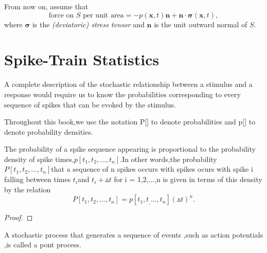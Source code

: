 

\begin{asm}
  \label{asm:surfaceForceViscous}
  From now on,
  assume that
  \begin{equation}
    \label{eq:surfaceForceSigma}
    \text{force on $S$ per unit area} = -p(\mathbf{x},t)\mathbf{n}+\mathbf{n}\cdot\boldsymbol\sigma(\mathbf{x},t),
  \end{equation}
  where $\boldsymbol\sigma$ is the \emph{(deviatoric) stress tensor} and
  $\mathbf{n}$ is the unit outward normal of $S$.
\end{asm}

\newpage
\section{Spike-Train Statistics}
\label{sec:1.4}


\begin{defn}
    A complete description of the stochastic relationship between a stimulus and a response would require us to know the probabilities corresponding to every sequence of spikes that can be evoked by the stimulus.    
\end{defn}

\begin{defn}    
    Throughout this book,we use the notation P[] to denote probabilities and p[] to denote probability densities.
\end{defn}    

\begin{thm}
    The probability of a spike sequence appearing is proportional to the probability density of spike times,$p[t_1,t_2,...,t_n]$.In other words,the probability $P[t_1,t_2,...,t_n]$that a sequence of n spikes occurs with spikes ocurs with spike i falling between times $t_i$and $t_i+\vartriangle t$ for i = 1,2,...,n is given in terms of this density by the relation 
    \begin{equation}
        P[t_1,t_2,...,t_n]=p[t_1,t_,...,t_n](\vartriangle t)^n.        
    \end{equation}
    \begin{proof}
    \end{proof}
\end{thm}

\begin{defn}
    A stochastic process that generates a sequence of events ,such as action potentials ,is called a pont process.    
\end{defn}

